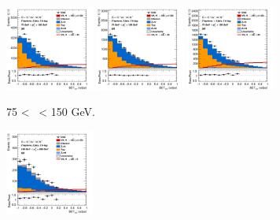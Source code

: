 \begin{figure}[h!]
    \centering
    \begin{subfigure}[b]{\textwidth}
        \centering
        \includegraphics[width=0.32\textwidth]{Images/VH/Own_fit/prefit_VHbb/Region_distmva_BMax150_BMin75_DSR_J2_TTypebb_T2_L2_Y6051_Prefit.png}
        \includegraphics[width=0.32\textwidth]{Images/VH/Own_fit/prefit_VHbb/Region_distmva_BMax150_BMin75_DSR_J3_TTypebb_T2_L2_Y6051_Prefit.png}
        \includegraphics[width=0.32\textwidth]{Images/VH/Own_fit/prefit_VHbb/Region_distmva_BMax150_BMin75_DSR_J4_TTypebb_incJet1_T2_L2_Y6051_Prefit.png}
        \caption{75 < \ptv\ < 150 GeV.}
        \label{fig:plots_VHbb_2L_75_SR}
    \end{subfigure}
    \begin{subfigure}[b]{\textwidth}
        \centering
        \includegraphics[width=0.32\textwidth]{Images/VH/Own_fit/prefit_VHbb/Region_distmva_BMax250_BMin150_DSR_J2_TTypebb_T2_L2_Y6051_Prefit.png}

\end{subfigure}
\end{figure}
